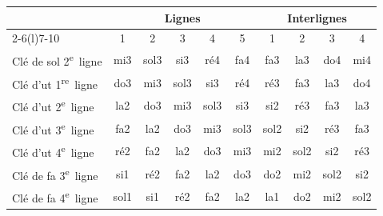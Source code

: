 \begin{tabular}{@{}l *{5}{c} @{\hspace{14pt}} *{4}{c}@{}}
\toprule
 & \multicolumn{5}{c}{\textbf{Lignes}} & \multicolumn{4}{c}{\textbf{Interlignes}} \\
\cmidrule(lr){2-6}\cmidrule(l){7-10}
 & 1 & 2 & 3 & 4 & 5 & 1 & 2 & 3 & 4 \\
\midrule
Clé de sol 2\textsuperscript{e}~ligne & mi3 & sol3 & si3 & ré4 & fa4 & fa3 & la3 & do4 & mi4 \\
\addlinespace[3pt]
Clé d'ut 1\textsuperscript{re}~ligne & do3 & mi3 & sol3 & si3 & ré4 & ré3 & fa3 & la3 & do4 \\
Clé d'ut 2\textsuperscript{e}~ligne & la2 & do3 & mi3 & sol3 & si3 & si2 & ré3 & fa3 & la3 \\
Clé d'ut 3\textsuperscript{e}~ligne & fa2 & la2 & do3 & mi3 & sol3 & sol2 & si2 & ré3 & fa3 \\
Clé d'ut 4\textsuperscript{e}~ligne & ré2 & fa2 & la2 & do3 & mi3 & mi2 & sol2 & si2 & ré3 \\
\addlinespace[3pt]
Clé de fa 3\textsuperscript{e}~ligne & si1 & ré2 & fa2 & la2 & do3 & do2 & mi2 & sol2 & si2 \\
Clé de fa 4\textsuperscript{e}~ligne & sol1 & si1 & ré2 & fa2 & la2 & la1 & do2 & mi2 & sol2 \\
\bottomrule
\end{tabular}
